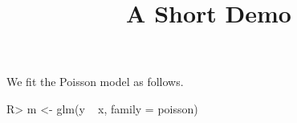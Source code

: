 \documentclass[article]{jss}
\title{A Short Demo}
\begin{document}
We fit the Poisson model as follows.
\begin{CodeInput}
R> m <- glm(y ~ x, family = poisson)
\end{CodeInput}
\end{document}
